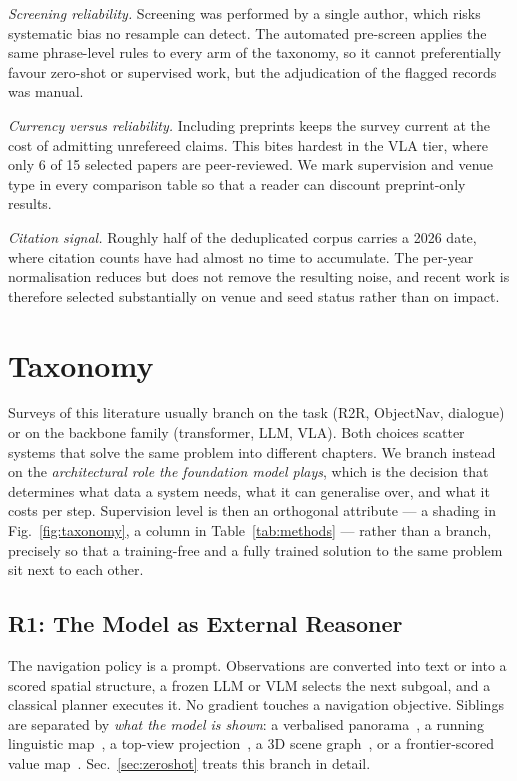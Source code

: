 \documentclass[journal]{IEEEtran}
\begin{document}
\emph{Screening reliability.} Screening was performed by a single author,
which risks systematic bias no resample can detect. The automated
pre-screen applies the same phrase-level rules to every arm of the
taxonomy, so it cannot preferentially favour zero-shot or supervised work,
but the adjudication of the \ScrCheck{} flagged records was manual.

\emph{Currency versus reliability.} Including preprints keeps the survey
current at the cost of admitting unrefereed claims. This bites hardest in
the VLA tier, where only 6 of 15 selected papers are peer-reviewed. We mark
supervision and venue type in every comparison table so that a reader can
discount preprint-only results.

\emph{Citation signal.} Roughly half of the deduplicated corpus carries a
2026 date, where citation counts have had almost no time to accumulate. The
per-year normalisation reduces but does not remove the resulting noise, and
recent work is therefore selected substantially on venue and seed status
rather than on impact.
\section{Taxonomy}\label{sec:taxonomy}
Surveys of this literature usually branch on the task (R2R, ObjectNav,
dialogue) or on the backbone family (transformer, LLM, VLA). Both choices
scatter systems that solve the same problem into different chapters. We
branch instead on the \emph{architectural role the foundation model plays},
which is the decision that determines what data a system needs, what it can
generalise over, and what it costs per step. Supervision level is then an
orthogonal attribute --- a shading in Fig.~\ref{fig:taxonomy}, a column in
Table~\ref{tab:methods} --- rather than a branch, precisely so that a
training-free and a fully trained solution to the same problem sit next to
each other.

\subsection{R1: The Model as External Reasoner}
The navigation policy is a prompt. Observations are converted into text or
into a scored spatial structure, a frozen LLM or VLM selects the next
subgoal, and a classical planner executes it. No gradient touches a
navigation objective. Siblings are separated by \emph{what the model is
shown}: a verbalised panorama~\cite{long2024discuss,qiao2025open}, a
running linguistic map~\cite{chen2024mapgpt}, a top-view
projection~\cite{zhong2026topv,zhang2025mapnav}, a 3D scene
graph~\cite{yin2024online,werby2024hierarchical,yin2025unigoal}, or a
frontier-scored value map~\cite{yokoyama2024vlfm,nie2025wmnav,long2024instructnav}.
Sec.~\ref{sec:zeroshot} treats this branch in detail.
\end{document}
